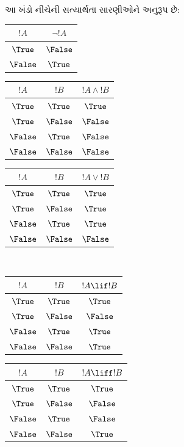 \begin{explain}
આ ખંડો નીચેની સત્યાર્થતા સારણીઓને અનુરૂપ છે:
\begin{center}

  \begin{tabular}{|c||c|} \hline
    $!A$ & $ \lnot !A$ \\
    \hline \hline
    $\True$ & $\False$ \\
    $\False$ & $\True$ \\
    \hline
  \end{tabular}


  \begin{tabular}{|cc||c|} \hline
    $!A$ & $!B$ & $!A \land !B$ \\
    \hline \hline
    $\True$ & $\True$ & $\True$ \\
    $\True$ & $\False$ & $\False$ \\
    $\False$ & $\True$ & $\False$ \\
    $\False$ & $\False$ & $\False$ \\
    \hline
  \end{tabular}


  \begin{tabular}{|cc||c|} \hline
    $!A$ & $!B$ & $!A \lor !B$ \\
    \hline \hline
    $\True$ & $\True$ & $\True$ \\
    $\True$ & $\False$ & $\True$ \\
    $\False$ & $\True$ & $\True$ \\
    $\False$ & $\False$ & $\False$ \\
    \hline
  \end{tabular}
%
\\[1em]

  \begin{tabular}{|cc||c|} \hline
    $!A$ & $!B$ & $!A \lif !B$ \\
    \hline \hline
    $\True$ & $\True$ & $\True$ \\
    $\True$ & $\False$ & $\False$ \\
    $\False$ & $\True$ & $\True$ \\
    $\False$ & $\False$ & $\True$ \\
    \hline
  \end{tabular}


  \begin{tabular}{|cc||c|} \hline
    $!A$ & $!B$ & $!A \liff !B$ \\
    \hline \hline
    $\True$ & $\True$ & $\True$ \\
    $\True$ & $\False$ & $\False$ \\
    $\False$ & $\True$ & $\False$ \\
    $\False$ & $\False$ & $\True$ \\
    \hline
  \end{tabular}

\end{center}
\end{explain}

